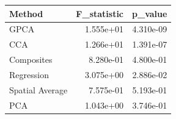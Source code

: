 \begin{tabular}{lrr}
\toprule
Method & F_statistic & p_value \\
\midrule
GPCA & 1.555e+01 & 4.310e-09 \\
CCA & 1.266e+01 & 1.391e-07 \\
Composites & 8.280e-01 & 4.800e-01 \\
Regression & 3.075e+00 & 2.886e-02 \\
Spatial Average & 7.575e-01 & 5.193e-01 \\
PCA & 1.043e+00 & 3.746e-01 \\
\bottomrule
\end{tabular}
